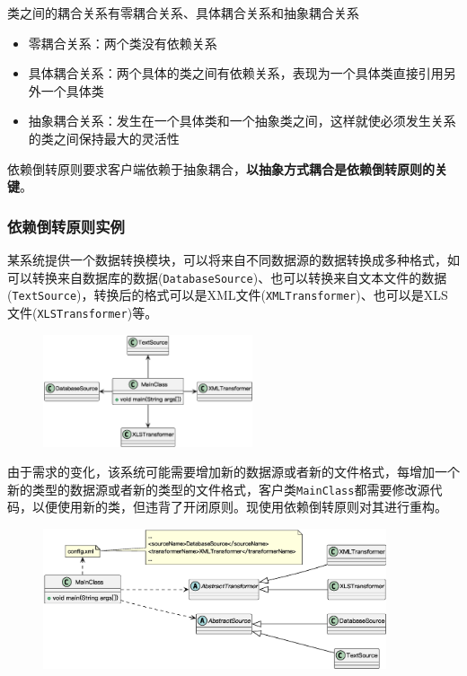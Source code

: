 类之间的耦合关系有零耦合关系、具体耦合关系和抽象耦合关系
\begin{itemize}
    \item 零耦合关系：两个类没有依赖关系
    \item 具体耦合关系：两个具体的类之间有依赖关系，表现为一个具体类直接引用另外一个具体类
    \item 抽象耦合关系：发生在一个具体类和一个抽象类之间，这样就使必须发生关系的类之间保持最大的灵活性
\end{itemize}

依赖倒转原则要求客户端依赖于抽象耦合，\textbf{以抽象方式耦合是依赖倒转原则的关键}。

\subsubsection{依赖倒转原则实例}
某系统提供一个数据转换模块，可以将来自不同数据源的数据转换成多种格式，如可以转换来自数据库的数据(\verb|DatabaseSource|)、也可以转换来自文本文件的数据(\verb|TextSource|)，转换后的格式可以是XML文件(\verb|XMLTransformer|)、也可以是XLS文件(\verb|XLSTransformer|)等。
\begin{figure}[H]
    \vspace{-0.5em}
	\centering
	\includegraphics[width=0.55\textwidth]{images/依赖倒转原则实例1.eps}
    \vspace{-1em}
\end{figure}

由于需求的变化，该系统可能需要增加新的数据源或者新的文件格式，每增加一个新的类型的数据源或者新的类型的文件格式，客户类\;\verb|MainClass|\;都需要修改源代码，以便使用新的类，但违背了开闭原则。现使用依赖倒转原则对其进行重构。
\begin{figure}[H]
    \vspace{-0.5em}
	\centering
	\includegraphics[width=0.9\textwidth]{images/依赖倒转原则实例2.eps}
    \vspace{-1em}
\end{figure}


